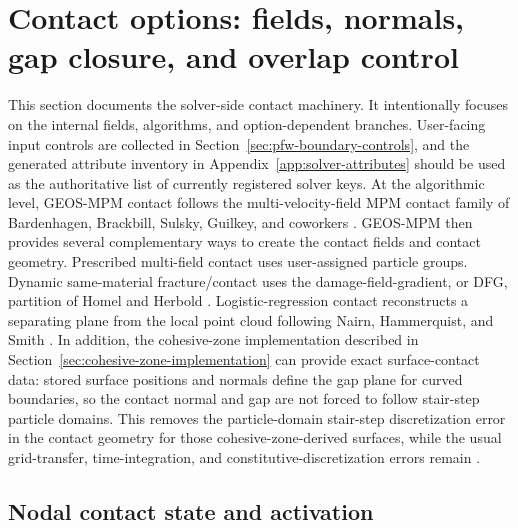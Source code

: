 \section{Contact options: fields, normals, gap closure, and overlap control}
\label{sec:contact-surface-detection-spacing}
\label{sec:contact-options}

This section documents the solver-side contact machinery.  It intentionally focuses on the internal fields, algorithms, and option-dependent branches.  User-facing input controls are collected in Section~\ref{sec:pfw-boundary-controls}, and the generated attribute inventory in Appendix~\ref{app:solver-attributes} should be used as the authoritative list of currently registered solver keys.  At the algorithmic level, GEOS-MPM contact follows the multi-velocity-field MPM contact family of Bardenhagen, Brackbill, Sulsky, Guilkey, and coworkers \cite{bardenhagen2000granular,bardenhagen2001contact}.  GEOS-MPM then provides several complementary ways to create the contact fields and contact geometry.  Prescribed multi-field contact uses user-assigned particle groups.  Dynamic same-material fracture/contact uses the damage-field-gradient, or DFG, partition of Homel and Herbold \cite{homel2016dfg}.  Logistic-regression contact reconstructs a separating plane from the local point cloud following Nairn, Hammerquist, and Smith \cite{nairn2020contact}.  In addition, the cohesive-zone implementation described in Section~\ref{sec:cohesive-zone-implementation} can provide exact surface-contact data: stored surface positions and normals define the gap plane for curved boundaries, so the contact normal and gap are not forced to follow stair-step particle domains.  This removes the particle-domain stair-step discretization error in the contact geometry for those cohesive-zone-derived surfaces, while the usual grid-transfer, time-integration, and constitutive-discretization errors remain \cite{crook2025cohesive}.

\subsection{Nodal contact state and activation}
\label{subsec:contact-state-activation}

